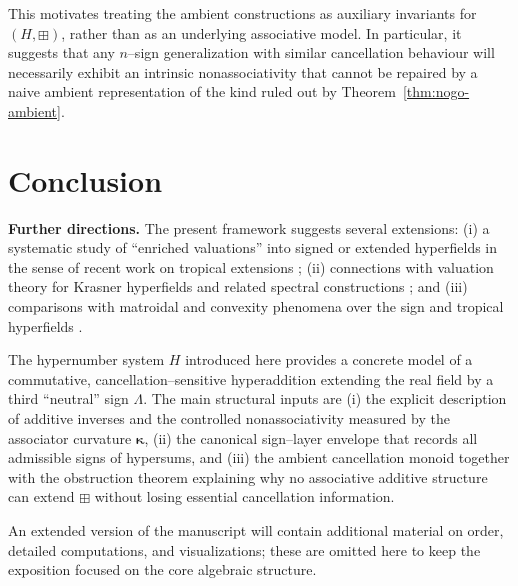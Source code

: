 \documentclass[11pt]{amsart}
\numberwithin{equation}{section}
\theoremstyle{definition}
\theoremstyle{remark}
\newcommand{\Hnum}{H}                      %
\newcommand{\AssocCurv}{\boldsymbol{\kappa}} %
\newcommand{\op}{\boxplus}                 %
\begin{document}
This motivates treating the ambient constructions as auxiliary
invariants for $(\Hnum,\op)$, rather than as an underlying associative
model.  In particular, it suggests that any $n$--sign generalization
with similar cancellation behaviour will necessarily exhibit an
intrinsic nonassociativity that cannot be repaired by a naive ambient
representation of the kind ruled out by
Theorem~\ref{thm:nogo-ambient}.



\section{Conclusion}
\label{sec:conclusion}

\noindent\textbf{Further directions.}
The present framework suggests several extensions: (i) a systematic study of
``enriched valuations'' into signed or extended hyperfields in the sense of
recent work on tropical extensions \cite{MaxwellSmith2024Extensions}; (ii)
connections with valuation theory for Krasner hyperfields and related spectral
constructions \cite{Linzi2025ValuationKrasner}; and (iii) comparisons with
matroidal and convexity phenomena over the sign and tropical hyperfields
\cite{BakerBowler2019MatroidsHyperfields,Loho2021SignedTropicalConvexity}.
\medskip

The hypernumber system $H$ introduced here provides a concrete model of a
commutative, cancellation--sensitive hyperaddition extending the real
field by a third ``neutral'' sign $\Lambda$.  The main structural inputs
are (i) the explicit description of additive inverses and the controlled
nonassociativity measured by the associator curvature $\AssocCurv$, (ii)
the canonical sign--layer envelope that records all admissible signs of
hypersums, and (iii) the ambient cancellation monoid together with the
obstruction theorem explaining why no associative additive structure can
extend $\op$ without losing essential cancellation information.

An extended version of the manuscript will contain additional material on
order, detailed computations, and visualizations; these are omitted here
to keep the exposition focused on the core algebraic structure.




\end{document}
